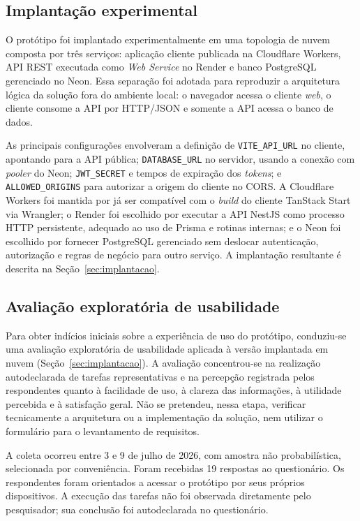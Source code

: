 \documentclass[a4paper,12pt]{article}
\begin{document}
\subsection{Implantação experimental}
\label{sec:metodo-implantacao}

O protótipo foi implantado experimentalmente em uma topologia de nuvem composta por três serviços: aplicação cliente publicada na Cloudflare Workers, API REST executada como \textit{Web Service} no Render e banco PostgreSQL gerenciado no Neon. Essa separação foi adotada para reproduzir a arquitetura lógica da solução fora do ambiente local: o navegador acessa o cliente \textit{web}, o cliente consome a API por HTTP/JSON e somente a API acessa o banco de dados.

As principais configurações envolveram a definição de \texttt{VITE\_API\_URL} no cliente, apontando para a API pública; \texttt{DATABASE\_URL} no servidor, usando a conexão com \textit{pooler} do Neon; \texttt{JWT\_SECRET} e tempos de expiração dos \textit{tokens}; e \texttt{ALLOWED\_ORIGINS} para autorizar a origem do cliente no CORS. A Cloudflare Workers foi mantida por já ser compatível com o \textit{build} do cliente TanStack Start via Wrangler; o Render foi escolhido por executar a API NestJS como processo HTTP persistente, adequado ao uso de Prisma e rotinas internas; e o Neon foi escolhido por fornecer PostgreSQL gerenciado sem deslocar autenticação, autorização e regras de negócio para outro serviço. A implantação resultante é descrita na Seção~\ref{sec:implantacao}.

\subsection{Avaliação exploratória de usabilidade}
\label{sec:metodo-avaliacao}

Para obter indícios iniciais sobre a experiência de uso do protótipo, conduziu-se uma avaliação exploratória de usabilidade aplicada à versão implantada em nuvem (Seção~\ref{sec:implantacao}). A avaliação concentrou-se na realização autodeclarada de tarefas representativas e na percepção registrada pelos respondentes quanto à facilidade de uso, à clareza das informações, à utilidade percebida e à satisfação geral. Não se pretendeu, nessa etapa, verificar tecnicamente a arquitetura ou a implementação da solução, nem utilizar o formulário para o levantamento de requisitos.

A coleta ocorreu entre 3 e 9 de julho de 2026, com amostra não probabilística, selecionada por conveniência. Foram recebidas 19 respostas ao questionário. Os respondentes foram orientados a acessar o protótipo por seus próprios dispositivos. A execução das tarefas não foi observada diretamente pelo pesquisador; sua conclusão foi autodeclarada no questionário.
\end{document}

